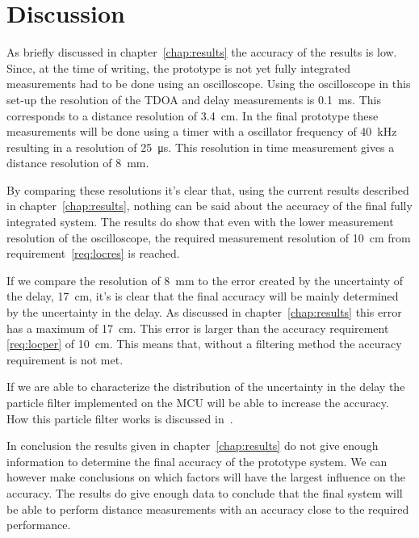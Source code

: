 \chapter{Discussion}

As briefly discussed in chapter~\ref{chap:results} the accuracy of the results is low.
Since, at the time of writing, the prototype is not yet fully integrated measurements had to be done using an oscilloscope.
Using the oscilloscope in this set-up the resolution of the TDOA and delay measurements is \SI{0.1}{\milli\second}.
This corresponds to a distance resolution of \SI{3.4}{\centi\meter}.
In the final prototype these measurements will be done using a timer with a oscillator frequency of \SI{40}{\kilo\hertz} resulting in a resolution of \SI{25}{\micro\second}.
This resolution in time measurement gives a distance resolution of \SI{8}{\milli\meter}.

By comparing these resolutions it's clear that, using the current results described in chapter~\ref{chap:results}, nothing can be said about the accuracy of the final fully integrated system.
The results do show that even with the lower measurement resolution of the oscilloscope, the required measurement resolution of \SI{10}{\centi\meter} from requirement~\ref{req:locres} is reached. 

If we compare the resolution of \SI{8}{\milli\meter} to the error created by the uncertainty of the delay, \SI{17}{\centi\meter}, it's is clear that the final accuracy will be mainly determined by the uncertainty in the delay.
As discussed in chapter~\ref{chap:results} this error has a maximum of \SI{17}{\centi\meter}.
This error is larger than the accuracy requirement \ref{req:locper} of \SI{10}{\centi\meter}.
This means that, without a filtering method the accuracy requirement is not met.

If we are able to characterize the distribution of the uncertainty in the delay the particle filter implemented on the MCU will be able to increase the accuracy.
How this particle filter works is discussed in~\cite{processing}.

In conclusion the results given in chapter~\ref{chap:results} do not give enough information to determine the final accuracy of the prototype system.
We can however make conclusions on which factors will have the largest influence on the accuracy.
The results do give enough data to conclude that the final system will be able to perform distance measurements with an accuracy close to the required performance.

